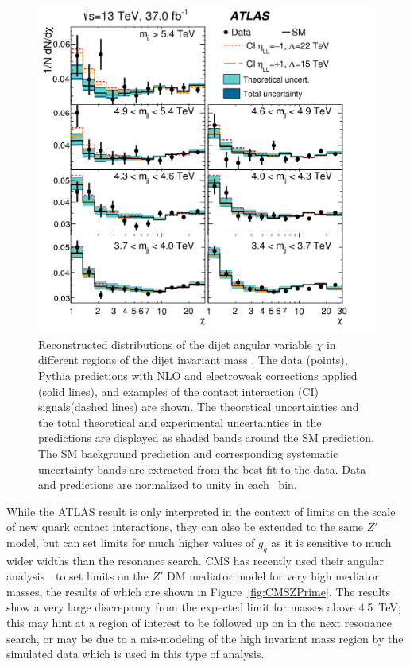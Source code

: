 \begin{figure}[]
	\centering
	\includegraphics[width=\columnwidth]{figures/Conclusion/AngularResult.png}
	\caption{Reconstructed distributions of the dijet angular variable $\chi$ in different regions of the dijet invariant mass \mjj. The data (points), Pythia predictions with NLO and electroweak corrections applied (solid lines), and examples of the contact interaction (CI) signals(dashed lines) are shown. The theoretical uncertainties and the total theoretical and experimental uncertainties in the predictions are displayed as shaded bands around the SM prediction. The SM background prediction and corresponding systematic uncertainty bands are extracted from the best-fit to the data. Data and predictions are normalized to unity in each \mjj~bin.}
	\label{fig:AngularResult}
\end{figure}

While the ATLAS result is only interpreted in the context of limits on the scale of new quark contact interactions, they can also be extended to the same $Z'$ model, but can set limits for much higher values of $g_q$ as it is sensitive to much wider widths than the resonance search.  CMS has recently used their angular analysis~\cite{CMSAngular}~to set limits on the $Z'$ DM mediator model for very high mediator masses, the results of which are shown in Figure~\ref{fig:CMSZPrime}.  The results show a very large discrepancy from the expected limit for masses above 4.5~TeV; this may hint at a region of interest to be followed up on in the next resonance search, or may be due to a mis-modeling of the high invariant mass region by the simulated data which is used in this type of analysis.


